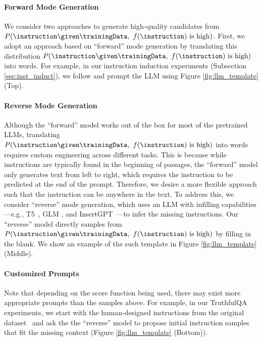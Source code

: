 \paragraph{Forward Mode Generation} We consider two approaches to generate high-quality candidates from $P(\instruction\given\trainingData,\ f(\instruction)\textrm{ is high})$. First, we adopt an approach based on ``forward'' mode generation by translating this distribution $P(\instruction\given\trainingData,\ f(\instruction)\textrm{ is high})$ into words. For example, in our instruction induction experiments (Subsection \ref{sec:inst_induct}), we follow \citet{honovich2022instruction} and prompt the LLM using Figure \ref{fig:llm_template} (Top). %

\paragraph{Reverse Mode Generation} Although the ``forward'' model works out of the box for most of the pretrained LLMs, translating $P(\instruction\given\trainingData,\ f(\instruction)\textrm{ is high})$ into words requires custom engineering across different tasks. This is because while instructions are typically found in the beginning of passages, the ``forward'' model only generates text from left to right, which requires the instruction to be predicted at the end of the prompt. Therefore, we desire a more flexible approach such that the instruction can be anywhere in the text. To address this, we consider ``reverse'' mode generation, which uses an LLM with infilling capabilities---e.g., T5~\citep{raffel2020exploring}, GLM \citep{du2022glm}, and InsertGPT~\citep{bavarian2022efficient}---to infer the missing instructions. Our ``reverse'' model directly samples from $P(\instruction\given\trainingData,\ f(\instruction)\textrm{ is high})$ by filling in the blank. We show an example of the such template in Figure \ref{fig:llm_template} (Middle).

\paragraph{Customized Prompts} Note that depending on the score function being used, there may exist more appropriate prompts than the samples above. For example, in our TruthfulQA experiments, we start with the human-designed instructions from the original dataset~\citep{lin2022truthfulqa} and ask the the ``reverse'' model to propose initial instruction samples that fit the missing context (Figure \ref{fig:llm_template} (Bottom)). 

